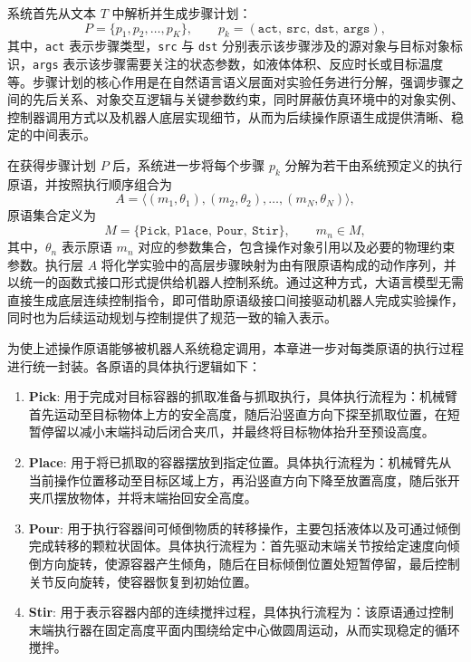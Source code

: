 系统首先从文本 $T$ 中解析并生成步骤计划：
\begin{equation}
P=\{p_1,p_2,\dots,p_K\}, \qquad
p_k=(\texttt{act},\ \texttt{src},\ \texttt{dst},\ \texttt{args}) ,
\label{eq:ch5_step_plan}
\end{equation}
其中，\texttt{act} 表示步骤类型，\texttt{src} 与 \texttt{dst} 分别表示该步骤涉及的源对象与目标对象标识，\texttt{args} 表示该步骤需要关注的状态参数，如液体体积、反应时长或目标温度等。步骤计划的核心作用是在自然语言语义层面对实验任务进行分解，强调步骤之间的先后关系、对象交互逻辑与关键参数约束，同时屏蔽仿真环境中的对象实例、控制器调用方式以及机器人底层实现细节，从而为后续操作原语生成提供清晰、稳定的中间表示。

在获得步骤计划 $P$ 后，系统进一步将每个步骤 $p_k$ 分解为若干由系统预定义的执行原语，并按照执行顺序组合为
\begin{equation}
A=\langle (m_1,\theta_1),(m_2,\theta_2),\dots,(m_N,\theta_N) \rangle ,
\label{eq:ch5_action_sequence}
\end{equation}
原语集合定义为
\begin{equation}
M=\{\mathtt{Pick},\ \mathtt{Place},\ \mathtt{Pour},\ \mathtt{Stir}\}, \qquad m_n\in M ,
\label{eq:ch5_primitive_set}
\end{equation}
其中，$\theta_n$ 表示原语 $m_n$ 对应的参数集合，包含操作对象引用以及必要的物理约束参数。执行层 $A$ 将化学实验中的高层步骤映射为由有限原语构成的动作序列，并以统一的函数式接口形式提供给机器人控制系统。通过这种方式，大语言模型无需直接生成底层连续控制指令，即可借助原语级接口间接驱动机器人完成实验操作，同时也为后续运动规划与控制提供了规范一致的输入表示。

为使上述操作原语能够被机器人系统稳定调用，本章进一步对每类原语的执行过程进行统一封装。各原语的具体执行逻辑如下：

\begin{enumerate}[nosep]
\item \textbf{Pick}: 用于完成对目标容器的抓取准备与抓取执行，具体执行流程为：机械臂首先运动至目标物体上方的安全高度，随后沿竖直方向下探至抓取位置，在短暂停留以减小末端抖动后闭合夹爪，并最终将目标物体抬升至预设高度。 
\item \textbf{Place}: 用于将已抓取的容器摆放到指定位置。具体执行流程为：机械臂先从当前操作位置移动至目标区域上方，再沿竖直方向下降至放置高度，随后张开夹爪摆放物体，并将末端抬回安全高度。 
\item \textbf{Pour}: 用于执行容器间可倾倒物质的转移操作，主要包括液体以及可通过倾倒完成转移的颗粒状固体。具体执行流程为：首先驱动末端关节按给定速度向倾倒方向旋转，使源容器产生倾角，随后在目标倾倒位置处短暂停留，最后控制关节反向旋转，使容器恢复到初始位置。 
\item \textbf{Stir}: 用于表示容器内部的连续搅拌过程，具体执行流程为：该原语通过控制末端执行器在固定高度平面内围绕给定中心做圆周运动，从而实现稳定的循环搅拌。
\end{enumerate}

